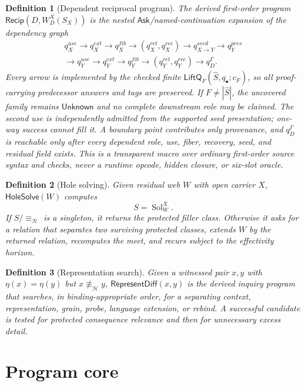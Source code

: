 \documentclass[11pt,oneside]{article}
\newtheorem{definition}{Definition}[section]
\begin{document}
\begin{definition}[Dependent reciprocal program]
The derived first-order program \(\mathsf{Recip}(D,W_D^X(S_X))\) is the nested
\(\mathsf{Ask}\)/named-continuation expansion of the dependency graph
\[
\boxed{
\begin{gathered}
q^{use}_X
\to q^{ext}_X
\to q^{fib}_X
\to (q^{ret}_X,q^{rec}_X)
\to q^{seed}_{X\to Y}
\to q^{pres}_Y\\
\to q^{use}_Y
\to q^{ext}_Y
\to q^{fib}_Y
\to (q^{ret}_Y,q^{rec}_Y)
\to q^\Gamma_D.
\end{gathered}
}
\]
Every arrow is implemented by the checked finite
\(\mathsf{LiftQ}_F(\widehat S,q_\bullet;c_F)\), so all proof-carrying predecessor answers and tags
are preserved.  If \(F\neq|\widehat S|\), the uncovered family remains \(\mathsf{Unknown}\) and no
complete downstream role may be claimed.  The second use is independently admitted from the
supported seed presentation; one-way success cannot fill it.  A boundary point contributes only
provenance, and \(q^\Gamma_D\) is reachable only after every dependent role, use, fiber, recovery,
seed, and residual field exists.  This is a transparent macro over ordinary first-order source
syntax and checks, never a runtime opcode, hidden closure, or six-slot oracle.
\end{definition}

\begin{definition}[Hole solving]
Given residual web \(W\) with open carrier \(X\), \(\mathsf{HoleSolve}(W)\) computes
\[
S=\operatorname{Sol}^{X}_{W}.
\]
If \(S/{\equiv_{\mathcal H}}\) is a singleton, it returns the protected filler class.  Otherwise it asks for a relation that separates two surviving protected classes, extends \(W\) by the returned relation, recomputes the meet, and recurs subject to the effectivity horizon.
\end{definition}

\begin{definition}[Representation search]
Given a witnessed pair \(x,y\) with \(\eta(x)=\eta(y)\) but \(x\not\equiv_{\mathcal H}y\), \(\mathsf{RepresentDiff}(x,y)\) is the derived inquiry program that searches, in binding-appropriate order, for a separating context, representation, grain, probe, language extension, or rebind.  A successful candidate is tested for protected consequence relevance and then for unnecessary excess detail.
\end{definition}

\section{Program core}
\end{document}
